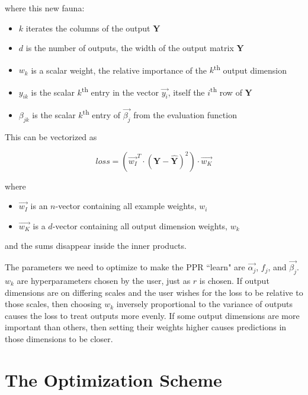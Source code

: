 \documentclass[12pt]{article}
\begin{document}
where this new fauna:
\begin{itemize}
	\setlength\itemsep{-2mm}
	\item $k$ iterates the columns of the output $\pmb{Y}$
	\item $d$ is the number of outputs, the width of the output matrix $\pmb{Y}$
	\item $w_k$ is a scalar weight, the relative importance of the $k$\textsuperscript{th} output dimension
	\item $y_{ik}$ is the scalar $k$\textsuperscript{th} entry in the vector $\vec{y_i}$, itself the $i$\textsuperscript{th} row of $\pmb{Y}$
	\item $\beta_{jk}$ is the scalar $k$\textsuperscript{th} entry of $\vec{\beta_j}$ from the evaluation function
\end{itemize}

This can be vectorized as

$$loss = (\vec{w_I}^T \cdot (\pmb{Y} - \pmb{\hat{Y}})^2) \cdot \vec{w_K}$$

where
\begin{itemize}
	\setlength\itemsep{-2mm}
	\item $\vec{w_I}$ is an $n$-vector containing all example weights, $w_i$
	\item $\vec{w_K}$ is a $d$-vector containing all output dimension weights, $w_k$
\end{itemize}
and the sums disappear inside the inner products.\newline

The parameters we need to optimize to make the PPR ``learn" are $\vec{\alpha_j}$, $f_j$, and $\vec{\beta_j}$. $w_k$ are hyperparameters chosen by the user, just as $r$ is chosen. If output dimensions are on differing scales and the user wishes for the loss to be relative to those scales, then choosing $w_k$ inversely proportional to the variance of outputs causes the loss to treat outputs more evenly. If some output dimensions are more important than others, then setting their weights higher causes predictions in those dimensions to be closer.

\section{The Optimization Scheme}
\end{document}
